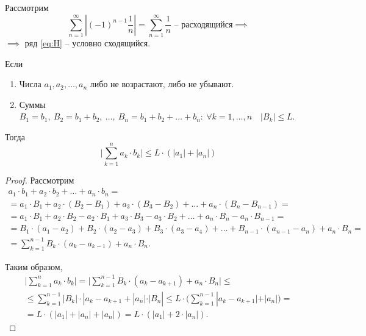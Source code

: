 \begin{example}
    Рассмотрим
    \[
        \sum_{n=1}^{\infty}\left|(-1)^{n-1}\frac{1}{n}\right| = \sum_{n=1}^{\infty}\frac{1}{n} \text{ -- расходящийся} \implies
    \] $\implies$ ряд \ref{eq:H} -- условно сходящийся.
\end{example}

\begin{lemma}
    Если
    \begin{enumerate}
        \item Числа $a_1,a_2,\ldots,a_n$ либо не возрастают, либо не убывают.
        \item Суммы $B_1 = b_1, \ B_2 = b_1 + b_2, \ \ldots, \ B_n = b_1 + b_2 + \ldots + b_n: \ \forall k = 1,\ldots,n \quad |B_k| \leqslant L$.
    \end{enumerate}

    Тогда
    \begin{equation}\label{eq:6.6}
        \bigg|\sum_{k=1}^{n} a_k \cdot b_k \bigg| \leqslant L\cdot (|a_1| + |a_n|)
    \end{equation}
\end{lemma}

\begin{proof}
    Рассмотрим
    \begin{multline*}
        a_1 \cdot b_1 + a_2 \cdot b_2 + \ldots + a_n \cdot b_n = \\
        = a_1 \cdot B_1 + a_2 \cdot (B_2 - B_1) + a_3 \cdot (B_3 - B_2) + \ldots + a_n \cdot (B_n - B_{n-1}) = \\
        = a_1 \cdot B_1 + a_2 \cdot B_2 - a_2 \cdot B_1 + a_3\cdot B_3 - a_3 \cdot B_2 + \ldots + a_n \cdot B_n - a_n \cdot B_{n-1} = \\
        = B_1\cdot (a_1 - a_2) + B_2\cdot (a_2 - a_3) + B_3 \cdot (a_3 - a_4) + \ldots + B_{n-1} \cdot (a_{n-1} - a_n) + a_n \cdot B_n = \\
        = \sum_{k=1}^{n-1} B_k \cdot (a_k - a_{k-1}) + a_n \cdot B_n.
    \end{multline*}

    Таким образом,
    \begin{multline*}
        \bigg|\sum_{k=1}^{n}a_k\cdot b_k \bigg| = \bigg|\sum_{k=1}^{n-1} B_k \cdot (a_k - a_{k+1}) + a_n \cdot B_n\bigg| \leqslant \\
        \leqslant \sum_{k=1}^{n-1}|B_k| \cdot |a_k - a_{k+1} + |a_n| \cdot |B_n| \leqslant L\cdot \bigg(\sum_{k=1}^{n-1}|a_k - a_{k+1}| + |a_n|\bigg) = \\
        = L\cdot (|a_1| + |a_n| + |a_n|) = L\cdot (|a_1| + 2\cdot |a_n|).
    \end{multline*}
\end{proof}

